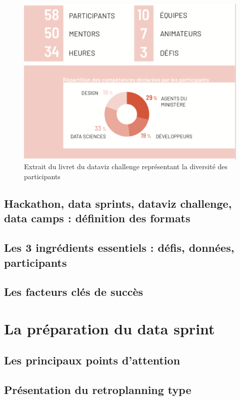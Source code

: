 \documentclass[]{book}
\begin{document}
\begin{figure}

{\centering \includegraphics[width=0.5\linewidth]{./img/participants} 

}

\caption{Extrait du livret du dataviz challenge représentant la diversité des participants}\label{fig:unnamed-chunk-13}
\end{figure}

\section{Hackathon, data sprints, dataviz challenge, data camps :
définition des
formats}\label{hackathon-data-sprints-dataviz-challenge-data-camps-definition-des-formats}

\section{Les 3 ingrédients essentiels : défis, données,
participants}\label{les-3-ingredients-essentiels-defis-donnees-participants}

\section{Les facteurs clés de succès}\label{les-facteurs-cles-de-succes}

\chapter{La préparation du data sprint}\label{preparation}

\section{Les principaux points
d'attention}\label{les-principaux-points-dattention}

\section{Présentation du retroplanning
type}\label{presentation-du-retroplanning-type}
\end{document}
